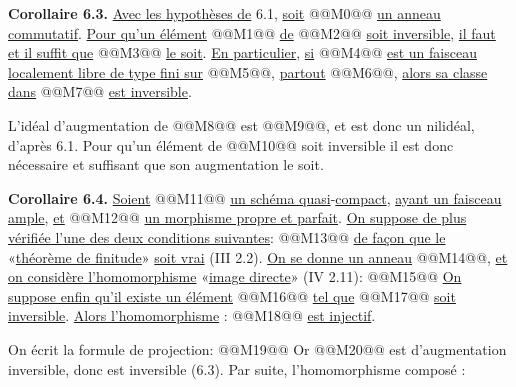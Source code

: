 
\textbf{Corollaire 6.3.} \uline{Avec les hypothèses de} 6.1, \uline{soit} @@M0@@ \uline{un anneau commutatif}. \uline{Pour qu'un élément} @@M1@@ \uline{de} @@M2@@ \uline{soit inversible}, \uline{il faut et il suffit que} @@M3@@ \uline{le soit}. \uline{En particulier}, \uline{si} @@M4@@ \uline{est un faisceau localement libre de type fini sur} @@M5@@, \uline{partout} @@M6@@, \uline{alors sa classe dans} @@M7@@ \uline{est inversible}.

L'idéal d'augmentation de @@M8@@ est @@M9@@, et est donc un nilidéal, d'après 6.1. Pour qu'un élément de @@M10@@ soit inversible il est donc nécessaire et suffisant que son augmentation le soit.

\textbf{Corollaire 6.4.} \uline{Soient} @@M11@@ \uline{un schéma quasi}-\uline{compact}, \uline{ayant un faisceau ample}, \uline{et} @@M12@@ \uline{un morphisme propre et parfait}. \uline{On suppose de plus vérifiée l'une des deux conditions suivantes}:
@@M13@@
\uline{de façon que le} «\uline{théorème de finitude}» \uline{soit vrai} (III 2.2). \uline{On se donne un anneau} @@M14@@, \uline{et} \uline{on considère l'homomorphisme} «\uline{image directe}» (IV 2.11):
@@M15@@
\uline{On suppose enfin qu'il existe un élément} @@M16@@ \uline{tel que} @@M17@@ \uline{soit inversible}. \uline{Alors l'homomorphisme} :
@@M18@@
\uline{est injectif}.

On écrit la formule de projection:
@@M19@@
Or @@M20@@ est d'augmentation inversible, donc est inversible (6.3). Par suite, l'homomorphisme composé :
